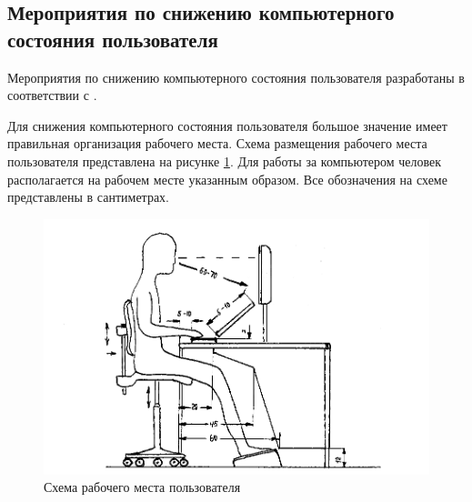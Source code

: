 \subsection {Мероприятия по снижению компьютерного состояния пользователя}
Мероприятия по снижению компьютерного состояния пользователя разработаны в соответствии с \cite{SANPIN}.

Для снижения компьютерного состояния пользователя большое значение имеет правильная организация рабочего места. Схема размещения рабочего места пользователя представлена на рисунке \ref {fig:workplace}. Для работы за компьютером человек располагается на рабочем месте указанным образом. Все обозначения на схеме представлены в сантиметрах. 

\begin {figure}[h]
	\centering
	\includegraphics[scale=0.9]{img/WorkPlace.png}
	\caption{Схема рабочего места пользователя}
	\label{fig:workplace}
\end {figure}

